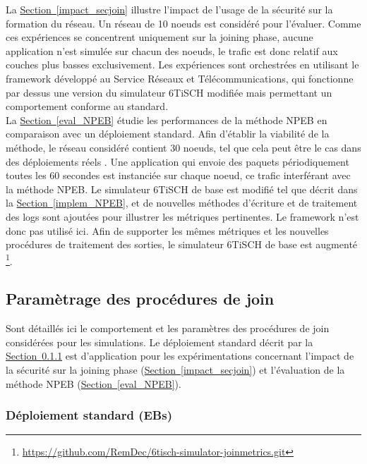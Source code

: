 \documentclass[]{report}
\newcommand{\wordlink}[2]{\hyperref[#2]{#1~\ref{#2}}}
\begin{document}
La \wordlink{Section}{impact_secjoin} illustre l'impact de l'usage de la sécurité sur la formation du réseau. Un réseau de 10 noeuds est considéré pour l'évaluer. Comme ces expériences se concentrent uniquement sur la joining phase, aucune application n'est simulée sur chacun des noeuds, le trafic est donc relatif aux couches plus basses exclusivement. Les expériences sont orchestrées en utilisant le framework développé au Service Réseaux et Télécommunications, qui fonctionne par dessus une version du simulateur 6TiSCH modifiée mais permettant un comportement conforme au standard.\\

La \wordlink{Section}{eval_NPEB} étudie les performances de la méthode NPEB en comparaison avec un déploiement standard. Afin d'établir la viabilité de la méthode, le réseau considéré contient 30 noeuds, tel que cela peut être le cas dans des déploiements réels \cite{openbenchmark}. Une application qui envoie des paquets périodiquement toutes les 60 secondes est instanciée sur chaque noeud, ce trafic interférant avec la méthode NPEB. Le simulateur 6TiSCH de base est modifié tel que décrit dans la \wordlink{Section}{implem_NPEB}, et de nouvelles méthodes d'écriture et de traitement des logs sont ajoutées pour illustrer les métriques pertinentes. Le framework n'est donc pas utilisé ici. Afin de supporter les mêmes métriques et les nouvelles procédures de traitement des sorties, le simulateur 6TiSCH de base est augmenté \footnote{\url{https://github.com/RemDec/6tisch-simulator-joinmetrics.git}}.

\newpage

\subsection{Paramètrage des procédures de join}
\label{exp_custom}

Sont détaillés ici le comportement et les paramètres des procédures de join considérées pour les simulations. Le déploiement standard décrit par la \wordlink{Section}{exp_custom_EB} est d'application pour les expérimentations concernant l'impact de la sécurité sur la joining phase (\wordlink{Section}{impact_secjoin}) et l'évaluation de la méthode NPEB (\wordlink{Section}{eval_NPEB}).

\subsubsection{Déploiement standard (EBs)}
\label{exp_custom_EB}
\end{document}
